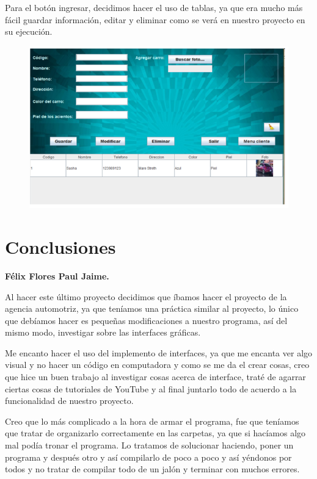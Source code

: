 \documentclass[12pt,a4paper]{report}
\begin{document}
{Para el botón ingresar, decidimos hacer el uso de tablas, ya que era mucho más fácil guardar información, editar y eliminar como se verá en nuestro proyecto en su ejecución.

\begin{figure}[hbtp]
\centering
\includegraphics[scale=0.8]{OP5.PNG}
\end{figure}


\section*{Conclusiones}
\textbf{Félix Flores Paul Jaime.}
\bigskip 

Al hacer este último proyecto decidimos que íbamos hacer el proyecto de la agencia automotriz, ya que teníamos una práctica similar al proyecto, lo único que debíamos hacer es pequeñas modificaciones a nuestro programa, así del mismo modo, investigar sobre las interfaces gráficas.
\medskip 

Me encanto hacer el uso del implemento de interfaces, ya que me encanta ver algo visual y no hacer un código en computadora y como se me da el crear cosas, creo que hice un buen trabajo al investigar cosas acerca de interface, traté de agarrar ciertas cosas de tutoriales de YouTube y al final juntarlo todo de acuerdo a la funcionalidad de nuestro proyecto. 
\medskip 

Creo que lo más complicado a la hora de armar el programa, fue que teníamos que tratar de organizarlo correctamente en las carpetas, ya que si hacíamos algo mal podía tronar el programa. Lo tratamos de solucionar haciendo, poner un programa y después otro y así compilarlo de poco a poco y así yéndonos por todos y no tratar de compilar todo de un jalón y terminar con muchos errores.
\medskip 

}
\end{document}
